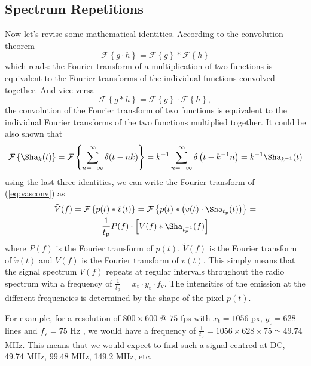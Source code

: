 \documentclass[a4paper,12pt,twoside,openright]{report}
\begin{document}
\subsection{Spectrum Repetitions}
Now let's revise some mathematical identities. According to the convolution theorem \cite{arfkenconvolution}
\begin{equation}
\mathcal{F} \left\{ g \cdot h \right\} = \mathcal{F} \left\{ g \right\} \ast  \mathcal{F} \left\{ h \right\}
\end{equation}
which reads: the Fourier transform of a multiplication of two functions is equivalent to the Fourier transforms of the individual functions convolved together. And vice versa
\begin{equation}
\mathcal{F} \left\{ g \ast h \right\} = \mathcal{F} \left\{ g \right\} \cdot  \mathcal{F} \left\{ h \right\} ,
\end{equation}
the convolution of the Fourier transform of two functions is equivalent to the individual Fourier transforms of the two functions multiplied together.
It could be also shown that
\begin{equation}
\mathcal{F} \left\{ \Sha_{k} (t) \right\} = 
\mathcal{F} \left\{ \sum\limits_{n=-\infty}^{\infty}  \delta(t-n k) \right\} =
k^{-1} \sum\limits_{n=-\infty}^{\infty}  \delta \left( t-k^{-1} n \right) =
k^{-1} \Sha_{k^{-1}}(t)
\end{equation}
using the last three identities, we can write the Fourier transform of (\ref{eq:vasconv}) as
\begin{multline} 
\label{eq:vspectrum}
\tilde{V}(f) = \mathcal{F} \left\{ p(t) \ast \hat{v}(t) \right\} = \mathcal{F} \left\{ p(t) \ast \left( v(t) \cdot \Sha_{t_{p}}(t) \right) \right\} = \\
\frac{1}{t_\text{p}} P(f) \cdot  \left[ V(f) \ast
\Sha_{t_{p}^{-1}}(f)  \right]
\end{multline}
where $P(f)$ is the Fourier transform of $p(t)$, $\tilde{V}(f)$ is the Fourier transform of $\tilde{v}(t)$ and $V(f)$ is the Fourier transform of $v(t)$. This simply means that the signal spectrum $V(f)$ repeats at regular intervals throughout the radio spectrum with a frequency of $\frac{1}{t_\text{p}} = x_\text{t} \cdot y_\text{t} \cdot f_\text{v}$. The intensities of the emission at the different frequencies is determined by the shape of the pixel $p(t)$.

For example, for a resolution of $800 \times 600 $ @ $ 75$ fps with $x_\text{t} = 1056$ px, $y_\text{t} = 628$ lines and $f_\text{v} = 75$ Hz , we would have a frequency of $\frac{1}{t_\text{p}} = 1056 \times 628 \times 75 \simeq 49.74$ MHz. This means that we would expect to find such a signal centred at DC, 49.74 MHz, 99.48 MHz, 149.2 MHz, etc.
\end{document}
